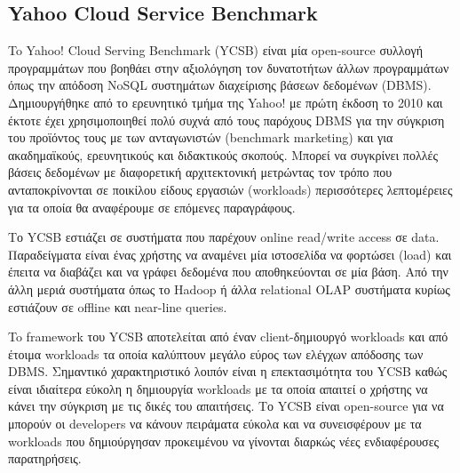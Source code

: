 \documentclass[conference]{IEEEtran}
\begin{document}
\subsection{Yahoo Cloud Service Benchmark}
        To Yahoo! Cloud Serving Benchmark (YCSB) είναι μία open-source συλλογή προγραμμάτων που βοηθάει στην αξιολόγηση τον δυνατοτήτων άλλων προγραμμάτων όπως την απόδοση NoSQL συστημάτων διαχείρισης βάσεων δεδομένων (DBMS). Δημιουργήθηκε από το ερευνητικό τμήμα της Yahoo! με πρώτη έκδοση το 2010 και έκτοτε έχει χρησιμοποιηθεί πολύ συχνά από τους παρόχους DBMS για την σύγκριση του προϊόντος τους με των ανταγωνιστών (benchmark marketing) και για ακαδημαϊκούς, ερευνητικούς και διδακτικούς σκοπούς. Μπορεί να συγκρίνει πολλές βάσεις δεδομένων με διαφορετική αρχιτεκτονική μετρώντας τον τρόπο που ανταποκρίνονται σε ποικίλου είδους εργασιών (workloads) περισσότερες λεπτομέρειες για τα οποία θα αναφέρουμε σε επόμενες παραγράφους.
       
        Το YCSB εστιάζει σε συστήματα που παρέχουν online read/write access σε data. Παραδείγματα είναι ένας χρήστης να αναμένει μία ιστοσελίδα να φορτώσει (load) και έπειτα να διαβάζει και να γράφει δεδομένα που αποθηκεύονται σε μία βάση. Από την άλλη μεριά συστήματα όπως το Hadoop ή  άλλα relational OLAP συστήματα κυρίως εστιάζουν σε offline και near-line queries.
	   
        To framework του YCSB αποτελείται από έναν client-δημιουργό workloads και από έτοιμα workloads τα οποία καλύπτουν μεγάλο εύρος των ελέγχων απόδοσης των DBMS. Σημαντικό χαρακτηριστικό λοιπόν είναι η επεκτασιμότητα του YCSB καθώς είναι ιδιαίτερα εύκολη η δημιουργία workloads με τα οποία απαιτεί ο χρήστης να κάνει την σύγκριση με τις δικές του απαιτήσεις. Το YCSB είναι open-source για να μπορούν οι developers να κάνουν πειράματα εύκολα και να συνεισφέρουν με τα workloads που δημιούργησαν προκειμένου να γίνονται διαρκώς νέες ενδιαφέρουσες παρατηρήσεις.
\end{document}
